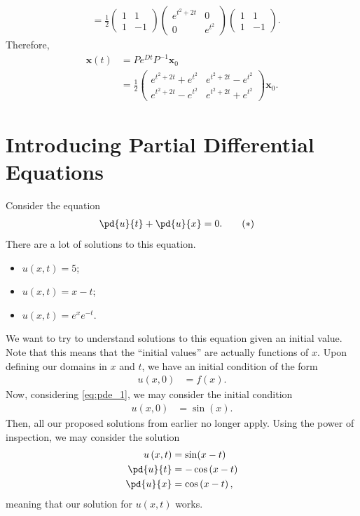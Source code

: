 \documentclass[10pt]{mypackage}
\begin{document}
\begin{example}
\begin{align*}
           &= \frac{1}{2} \begin{pmatrix}1 & 1 \\ 1 & -1\end{pmatrix} \begin{pmatrix}e^{t^2 + 2t} & 0 \\ 0 & e^{t^2}\end{pmatrix} \begin{pmatrix}1 & 1 \\ 1 & -1\end{pmatrix}.
  \end{align*}
  Therefore,
  \begin{align*}
    \mathbf{x}(t) &= Pe^{Dt}P^{-1} \mathbf{x}_0\\
                  &= \frac{1}{2} \begin{pmatrix}e^{t^2 + 2t} + e^{t^2} & e^{t^2 + 2t} - e^{t^2} \\ e^{t^2 + 2t} - e^{t^2} & e^{t^2 + 2t} + e^{t^2}\end{pmatrix} \mathbf{x}_0.
  \end{align*}
\end{example}
\section{Introducing Partial Differential Equations}%
Consider the equation
\begin{align*}
  \pd{u}{t} + \pd{u}{x} &= 0.\label{eq:pde_1}\tag{\textasteriskcentered}
\end{align*}
There are a lot of solutions to this equation.
\begin{itemize}
  \item $u(x,t) = 5$;
  \item $u(x,t) = x-t$;
  \item $u(x,t) = e^{x}e^{-t}$.
\end{itemize}
We want to try to understand solutions to this equation given an initial value. Note that this means that the ``initial values'' are actually functions of $x$. Upon defining our domains in $x$ and $t$, we have an initial condition of the form
\begin{align*}
  u\left( x,0 \right) &= f(x).
\end{align*}
Now, considering \eqref{eq:pde_1}, we may consider the initial condition
\begin{align*}
  u\left( x,0 \right) &= \sin(x).
\end{align*}
Then, all our proposed solutions from earlier no longer apply. Using the power of inspection, we may consider the solution
\begin{align*}
  u\left( x,t \right) &= \sin(x-t)\\
  \pd{u}{t} &= -\cos\left( x-t \right)\\
  \pd{u}{x} &= \cos\left( x-t \right),
\end{align*}
meaning that our solution for $u\left( x,t \right)$ works.\newline
\end{document}
